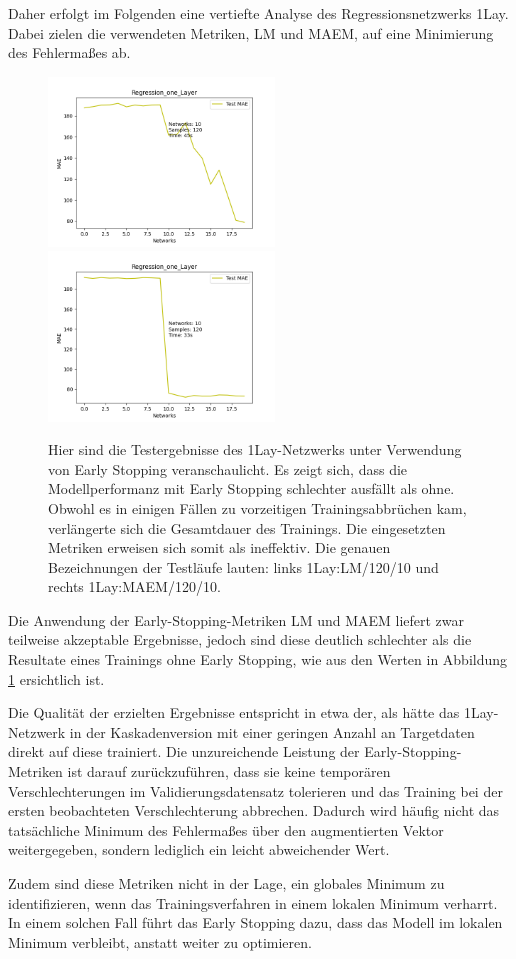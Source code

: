 Daher erfolgt im Folgenden eine vertiefte Analyse des Regressionsnetzwerks 1Lay. Dabei zielen die verwendeten Metriken, LM und MAEM, auf eine 
Minimierung des Fehlermaßes ab.

\begin{figure}[htpb]
    \includegraphics[height=4.5cm]{../../Plots/ba_plots/earlystopping/lossmetric/onelayer_ts.png}
    \includegraphics[height=4.5cm]{../../Plots/ba_plots/earlystopping/intermetric/onelayer_ts.png}
    \caption{\label{fig:onelayermetrics} 
    \small{Hier sind die Testergebnisse des 1Lay-Netzwerks unter Verwendung von Early Stopping veranschaulicht. Es zeigt sich, 
    dass die Modellperformanz mit Early Stopping schlechter ausfällt als ohne. 
    Obwohl es in einigen Fällen zu vorzeitigen Trainingsabbrüchen kam, verlängerte sich die Gesamtdauer des Trainings. Die eingesetzten 
    Metriken erweisen sich somit als ineffektiv. 
    Die genauen Bezeichnungen der Testläufe lauten: links 1Lay:LM/120/10 und rechts 1Lay:MAEM/120/10.}}
\end{figure}

Die Anwendung der Early-Stopping-Metriken LM und MAEM liefert zwar teilweise akzeptable Ergebnisse, jedoch sind diese deutlich schlechter als die 
Resultate eines Trainings ohne Early Stopping, wie aus den Werten in Abbildung \ref{fig:onelayermetrics} ersichtlich ist.

Die Qualität der erzielten Ergebnisse entspricht in etwa der, als hätte das 1Lay-Netzwerk in der Kaskadenversion mit einer geringen Anzahl an 
Targetdaten direkt auf diese trainiert. Die unzureichende Leistung der Early-Stopping-Metriken ist darauf zurückzuführen, dass sie keine temporären 
Verschlechterungen im Validierungsdatensatz tolerieren und das Training bei der ersten beobachteten Verschlechterung abbrechen. Dadurch wird 
häufig nicht das tatsächliche Minimum des Fehlermaßes über den augmentierten Vektor weitergegeben, sondern lediglich ein leicht abweichender 
Wert.

Zudem sind diese Metriken nicht in der Lage, ein globales Minimum zu identifizieren, wenn das Trainingsverfahren in einem lokalen Minimum 
verharrt. In einem solchen Fall führt das Early Stopping dazu, dass das Modell im lokalen Minimum verbleibt, anstatt weiter zu 
optimieren.
